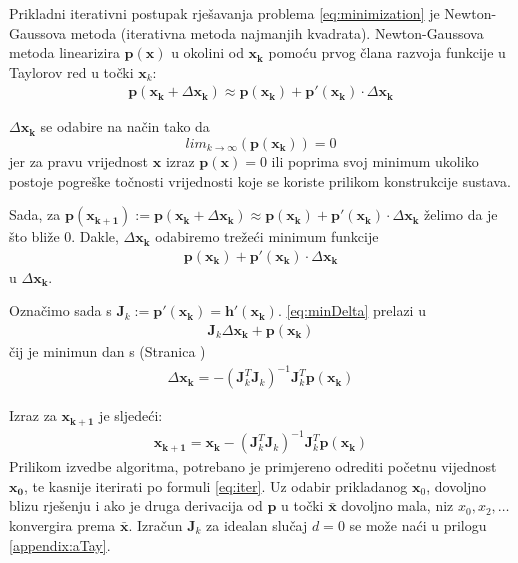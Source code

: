 \documentclass[a4paper,twoside,12pt]{memoir} %
\begin{document}
Prikladni iterativni postupak rješavanja problema \ref{eq:minimization} je Newton-Gaussova metoda (iterativna metoda najmanjih kvadrata).
Newton-Gaussova metoda linearizira $\mathbf{p}(\mathbf{x})$ u okolini od $\mathbf{x_k}$ pomoću prvog člana razvoja funkcije u Taylorov red\label{stranica:NGLin} u točki $\mathbf{x}_k$:
\begin{align}\label{eq:approx}
	\mathbf{p}(\mathbf{x_k}+ \Delta \mathbf{x_k}) \approx \mathbf{p}(\mathbf{x_k}) + \mathbf{p}'(\mathbf{ x_k})\cdot \Delta \mathbf{x_k}
\end{align}

$\Delta \mathbf{x_k}$ se odabire na način tako da
$$lim_{k \to \infty} \left( \mathbf{p}(\mathbf{x_k}) \right) = 0$$ 
jer za pravu vrijednost $\mathbf{x}$ izraz $\mathbf{p}(\mathbf{x}) = 0$ ili poprima svoj minimum ukoliko postoje pogreške
točnosti vrijednosti koje se koriste prilikom konstrukcije sustava.
 
Sada, za $\mathbf{p}(\mathbf{x_{k+1}}) := \mathbf{p}(\mathbf{x_k}+ \Delta \mathbf{x_k}) \approx \mathbf{p}(\mathbf{x_k}) + \mathbf{p}'(\mathbf{x_k})\cdot \Delta \mathbf{x_k}$ želimo
 da je što bliže 0.
 Dakle, $ \Delta \mathbf{x_k} $ odabiremo trežeći minimum funkcije
\begin{align}\label{eq:minDelta}
	\mathbf{p}(\mathbf{x_k}) + \mathbf{p}'(\mathbf{x_k})\cdot \Delta \mathbf{x_k}
\end{align}
u $\Delta \mathbf{x_k}$.

Označimo sada s $\mathbf{J}_k := \mathbf{p}'(\mathbf{x_k}) = \mathbf{h}'(\mathbf{x_k})$.
\ref{eq:minDelta} prelazi u 
\begin{align}\label{eq:minDelta2}
	\mathbf{J}_k \Delta \mathbf{x_k} +\mathbf{p}(\mathbf{x_k})
\end{align}
čij je minimun dan s (Stranica \pageref{stranica:nastavakLS})  
\begin{align}\label{eq:minDeltaRj}
\Delta \mathbf{x_k} = - (\mathbf{J}_k^T\mathbf{J}_k)^{-1}\mathbf{J}_k^T \mathbf{p}(\mathbf{x_k})
\end{align}

Izraz za $\mathbf{x_{k+1}}$ je sljedeći:
\begin{align}\label{eq:iter}
	\mathbf{x_{k+1}} = \mathbf{x_{k}} - (\mathbf{J}_k^T\mathbf{J}_k)^{-1}\mathbf{J}_k^T \mathbf{p}(\mathbf{x_k})
\end{align}
Prilikom izvedbe algoritma, potrebano je primjereno odrediti početnu vijednost $\mathbf{x_0}$, te kasnije iterirati po formuli \ref{eq:iter}.
Uz odabir prikladanog $\mathbf{x}_0$, dovoljno blizu rješenju i
ako je druga derivacija od $\mathbf{p}$ u točki $\bar{\mathbf{x}}$ dovoljno mala,
niz $x_0,x_2, \hdots$ konvergira prema $\bar{\mathbf{x}}$. Izračun $\mathbf{J}_k$ za idealan slučaj $d = 0$ se može naći u prilogu \ref{appendix:aTay}.
\end{document}
